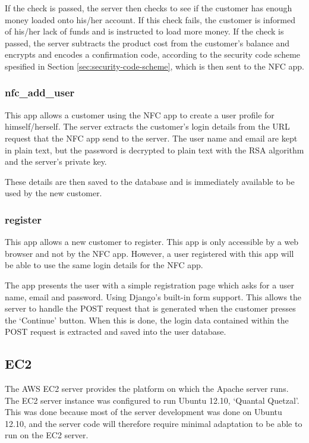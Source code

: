 If the check is passed, the server then checks to see if the customer has enough money loaded
onto his/her account. If this check fails, the customer is informed of his/her lack of funds
and is instructed to load more money. If the check is passed, the server subtracts the product
cost from the customer's balance and encrypts and encodes a confirmation code, according to the
security code scheme spesified in Section \ref{sec:security-code-scheme}, which is then sent
to the NFC app. 

\subsubsection{nfc\_add\_user}

This app allows a customer using the NFC app to create a user profile for himself/herself. The
server extracts the customer's login details from the URL request that the NFC app send to the
server. The user name and email are kept in plain text, but the password is decrypted to
plain text with the RSA algorithm and the server's private key.

These details are then saved to the database and is immediately available to be used by the new
customer. 

\subsubsection{register}

This app allows a new customer to register. This app is only accessible by a web browser and
not by the NFC app. However, a user registered with this app will be able to use the same login
details for the NFC app.

The app presents the user with a simple registration page which asks for a user name, email and
password. Using Django's built-in form support. This allows the server to handle the
POST request that is generated when the customer presses the `Continue' button. When this is
done, the login data contained within the POST request is extracted and saved into the user
database. 

\subsection{EC2}

The AWS EC2 server provides the platform on which the Apache server runs. The EC2 server
instance was configured to run Ubuntu 12.10, `Quantal Quetzal'. This was done because most of
the server development was done on Ubuntu 12.10, and the server code will therefore require
minimal adaptation to be able to run on the EC2 server. 

